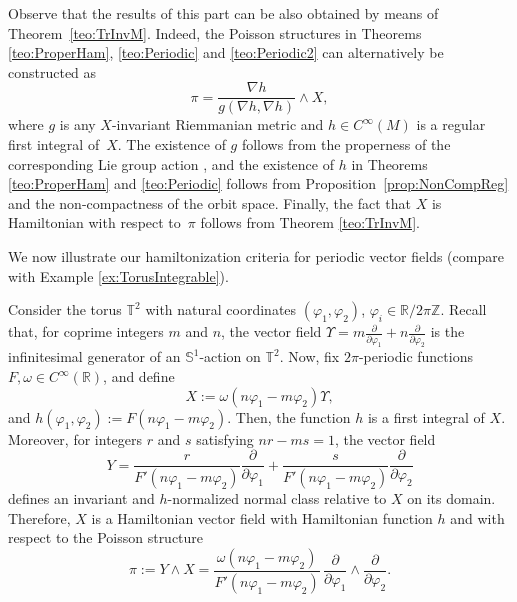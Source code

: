 \documentclass[10pt,a4paper]{amsart}
\numberwithin{equation}{section}
\begin{document}
Observe that the results of this part can be also obtained by means of Theorem~\ref{teo:TrInvM}. Indeed, the Poisson structures in Theorems \ref{teo:ProperHam}, \ref{teo:Periodic} and \ref{teo:Periodic2} can alternatively be constructed as
 \begin{equation*}
 \pi=\frac{\nabla h}{g(\nabla h,\nabla h)}\wedge X,
 \end{equation*}
where $g$ is any $X$-invariant Riemmanian metric and $h \in C^{\infty}(M)$ is a regular first integral of~$X$. The existence of $g$ follows from the properness of the corresponding Lie group action \cite[Proposition 2.5.2]{Duistermaat-1999}, and the existence of $h$ in Theorems \ref{teo:ProperHam} and \ref{teo:Periodic} follows from Proposition~\ref{prop:NonCompReg} and the non-compactness of the orbit space. Finally, the fact that $X$ is Hamiltonian with respect to~$\pi$ follows from Theorem \ref{teo:TrInvM}.

We now illustrate our hamiltonization criteria for periodic vector fields (compare with Example \ref{ex:TorusIntegrable}).

\begin{Example}
Consider the torus $\mathbb{T}^2$ with natural coordinates $(\varphi_1,\varphi_2)$, $\varphi_i \in \mathbb{R}/2\pi\mathbb{Z}$.
Recall that, for coprime integers $m$ and $n$, the vector field $\Upsilon = m \tfrac{\partial}{\partial\varphi_1} + n\tfrac{\partial}{\partial\varphi_2}$ is the infinitesimal generator of an $\mathbb{S}^1$-action on $\mathbb{T}^2$. Now, fix $2\pi$-periodic functions $F,\omega\in C^{\infty}(\mathbb{R})$, and define
 \begin{equation*}
 X := \omega(n\varphi_1-m\varphi_2) \Upsilon,
 \end{equation*}
and $h(\varphi_{1}, \varphi_{2}):=F(n\varphi_{1} - m\varphi_{2})$. Then, the function $h$ is a first integral of $X$.
Moreover, for integers $r$ and $s$ satisfying $nr-ms=1$, the vector field
 \begin{equation*}
 Y = \frac{r}{F'(n\varphi_{1} - m\varphi_{2})}\frac{\partial}{\partial\varphi_1} + \frac{s}{F'(n\varphi_{1} - m\varphi_{2})}\frac{\partial}{\partial\varphi_2}
 \end{equation*}
defines an invariant and $h$-normalized normal class relative to $X$ on its domain.
Therefore, $X$ is a Hamiltonian vector field with Hamiltonian function $h$ and with respect to the Poisson structure
 \begin{equation*}
 \pi := Y \wedge X = \frac{\omega(n\varphi_1-m\varphi_2)}{F'(n\varphi_{1} - m\varphi_{2})}\, \frac{\partial}{\partial \varphi_1}\wedge \frac{\partial}{\partial \varphi_2}.
 \end{equation*}
\end{Example}
\end{document}
